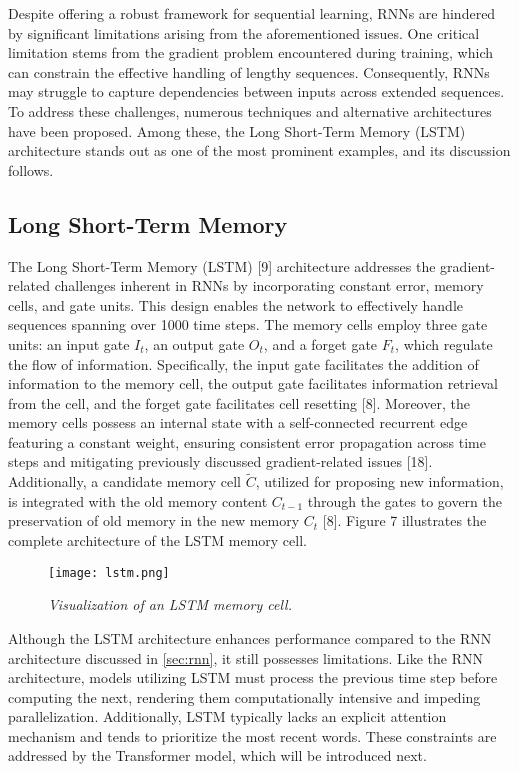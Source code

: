 Despite offering a robust framework for sequential learning, RNNs are hindered by significant limitations arising from the aforementioned issues. One critical limitation stems from the gradient problem encountered during training, which can constrain the effective handling of lengthy sequences. Consequently, RNNs may struggle to capture dependencies between inputs across extended sequences. To address these challenges, numerous techniques and alternative architectures have been proposed. Among these, the Long Short-Term Memory (LSTM) architecture stands out as one of the most prominent examples, and its discussion follows.

\subsection{Long Short-Term Memory}

The Long Short-Term Memory (LSTM) [9] architecture addresses the gradient-related challenges inherent in RNNs by incorporating constant error, memory cells, and gate units. This design enables the network to effectively handle sequences spanning over 1000 time steps. The memory cells employ three gate units: an input gate \(I_t\), an output gate \(O_t\), and a forget gate \(F_t\), which regulate the flow of information. Specifically, the input gate facilitates the addition of information to the memory cell, the output gate facilitates information retrieval from the cell, and the forget gate facilitates cell resetting [8]. Moreover, the memory cells possess an internal state with a self-connected recurrent edge featuring a constant weight, ensuring consistent error propagation across time steps and mitigating previously discussed gradient-related issues [18]. Additionally, a candidate memory cell \(\tilde{C}\), utilized for proposing new information, is integrated with the old memory content \(C_{t-1}\) through the gates to govern the preservation of old memory in the new memory \(C_t\) [8]. Figure 7 illustrates the complete architecture of the LSTM memory cell.

\begin{figure}[H]
    \centering
    \texttt{[image: lstm.png]}
    \caption{
        \it{Visualization of an LSTM memory cell.}
    }
    \label{fig:lstm}
\end{figure}

Although the LSTM architecture enhances performance compared to the RNN architecture discussed in \autoref{sec:rnn}, it still possesses limitations. Like the RNN architecture, models utilizing LSTM must process the previous time step before computing the next, rendering them computationally intensive and impeding parallelization. Additionally, LSTM typically lacks an explicit attention mechanism and tends to prioritize the most recent words. These constraints are addressed by the Transformer model, which will be introduced next.
